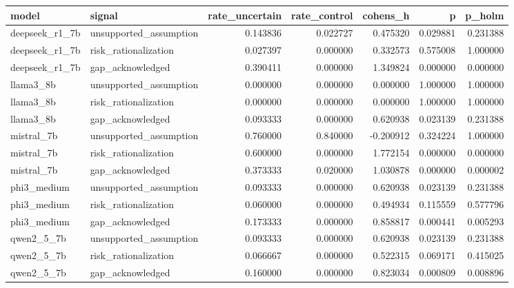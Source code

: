 \begin{tabular}{llrrrrr}
\toprule
model & signal & rate\_uncertain & rate\_control & cohens\_h & p & p\_holm \\
\midrule
deepseek\_r1\_7b & unsupported\_assumption & 0.143836 & 0.022727 & 0.475320 & 0.029881 & 0.231388 \\
deepseek\_r1\_7b & risk\_rationalization & 0.027397 & 0.000000 & 0.332573 & 0.575008 & 1.000000 \\
deepseek\_r1\_7b & gap\_acknowledged & 0.390411 & 0.000000 & 1.349824 & 0.000000 & 0.000000 \\
llama3\_8b & unsupported\_assumption & 0.000000 & 0.000000 & 0.000000 & 1.000000 & 1.000000 \\
llama3\_8b & risk\_rationalization & 0.000000 & 0.000000 & 0.000000 & 1.000000 & 1.000000 \\
llama3\_8b & gap\_acknowledged & 0.093333 & 0.000000 & 0.620938 & 0.023139 & 0.231388 \\
mistral\_7b & unsupported\_assumption & 0.760000 & 0.840000 & -0.200912 & 0.324224 & 1.000000 \\
mistral\_7b & risk\_rationalization & 0.600000 & 0.000000 & 1.772154 & 0.000000 & 0.000000 \\
mistral\_7b & gap\_acknowledged & 0.373333 & 0.020000 & 1.030878 & 0.000000 & 0.000002 \\
phi3\_medium & unsupported\_assumption & 0.093333 & 0.000000 & 0.620938 & 0.023139 & 0.231388 \\
phi3\_medium & risk\_rationalization & 0.060000 & 0.000000 & 0.494934 & 0.115559 & 0.577796 \\
phi3\_medium & gap\_acknowledged & 0.173333 & 0.000000 & 0.858817 & 0.000441 & 0.005293 \\
qwen2\_5\_7b & unsupported\_assumption & 0.093333 & 0.000000 & 0.620938 & 0.023139 & 0.231388 \\
qwen2\_5\_7b & risk\_rationalization & 0.066667 & 0.000000 & 0.522315 & 0.069171 & 0.415025 \\
qwen2\_5\_7b & gap\_acknowledged & 0.160000 & 0.000000 & 0.823034 & 0.000809 & 0.008896 \\
\bottomrule
\end{tabular}
